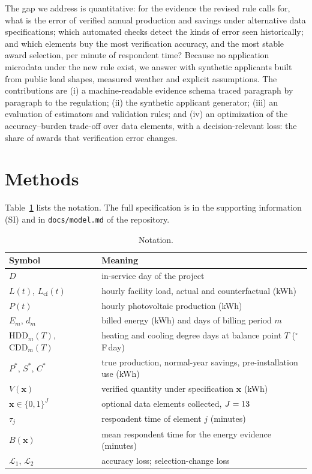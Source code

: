 \documentclass[preprint,12pt]{elsarticle}
\begin{document}
The gap we address is quantitative: for the evidence the revised rule calls for, what is
the error of verified annual production and savings under alternative data
specifications; which automated checks detect the kinds of error seen historically; and
which elements buy the most verification accuracy, and the most stable award selection,
per minute of respondent time? Because no application microdata under the new rule
exist, we answer with synthetic applicants built from public load shapes, measured
weather and explicit assumptions. The contributions are (i) a machine-readable evidence
schema traced paragraph by paragraph to the regulation; (ii) the synthetic applicant
generator; (iii) an evaluation of estimators and validation rules; and (iv) an
optimization of the accuracy--burden trade-off over data elements, with a
decision-relevant loss: the share of awards that verification error changes.

\section{Methods}

Table~\ref{tab:notation} lists the notation. The full specification is in the supporting
information (SI) and in \texttt{docs/model.md} of the repository.

\begin{table}[t]
\caption{Notation.}\label{tab:notation}
\centering\small
\begin{tabular}{ll}
\hline
Symbol & Meaning \\
\hline
$D$ & in-service day of the project \\
$L(t)$, $L_{\mathrm{cf}}(t)$ & hourly facility load, actual and counterfactual (kWh) \\
$P(t)$ & hourly photovoltaic production (kWh) \\
$E_m$, $d_m$ & billed energy (kWh) and days of billing period $m$ \\
$\mathrm{HDD}_m(T)$, $\mathrm{CDD}_m(T)$ & heating and cooling degree days at balance point $T$ ($^\circ$F\,day) \\
$P^\ast$, $S^\ast$, $C^\ast$ & true production, normal-year savings, pre-installation use (kWh) \\
$V(\mathbf{x})$ & verified quantity under specification $\mathbf{x}$ (kWh) \\
$\mathbf{x}\in\{0,1\}^{J}$ & optional data elements collected, $J=13$ \\
$\tau_j$ & respondent time of element $j$ (minutes) \\
$B(\mathbf{x})$ & mean respondent time for the energy evidence (minutes) \\
$\mathcal{L}_1$, $\mathcal{L}_2$ & accuracy loss; selection-change loss \\
\hline
\end{tabular}
\end{table}
\end{document}
